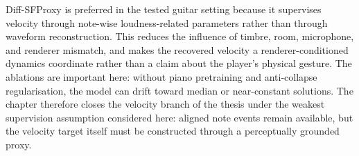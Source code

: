 Diff-SFProxy is preferred in the tested guitar setting because it supervises velocity through note-wise loudness-related parameters rather than through waveform reconstruction. This reduces the influence of timbre, room, microphone, and renderer mismatch, and makes the recovered velocity a renderer-conditioned dynamics coordinate rather than a claim about the player’s physical gesture. The ablations are important here: without piano pretraining and anti-collapse regularisation, the model can drift toward median or near-constant solutions. The chapter therefore closes the velocity branch of the thesis under the weakest supervision assumption considered here: aligned note events remain available, but the velocity target itself must be constructed through a perceptually grounded proxy.